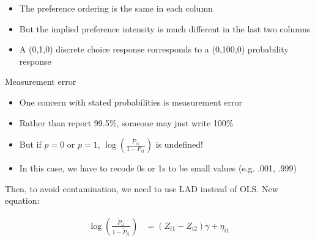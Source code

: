\documentclass[aspectratio=169]{beamer}
\begin{document}
\begin{frame}

\begin{itemize}
\itemsep1.5em
\item<1-> The preference ordering is the same in each column
\item<2-> But the implied preference intensity is much different in the last two columns
\item<3-> A (0,1,0) discrete choice response corresponds to a (0,100,0) probability response
\end{itemize}

\end{frame}

\begin{frame}

Measurement error

\bigskip{}

\begin{itemize}
\itemsep1.5em
\item<2-> One concern with stated probabilities is measurement error
\item<3-> Rather than report 99.5\%, someone may just write 100\%
\item<4-> But if $p=0$ or $p=1$, $\log\left(\frac{P_{i1}}{1-P_{i1}}\right)$ is undefined!
\item<5-> In this case, we have to recode 0s or 1s to be small values (e.g. .001, .999)
\end{itemize}

\end{frame}

\begin{frame}

Then, to avoid contamination, we need to use LAD instead of OLS. New equation:

\begin{align*}
\log\left(\frac{\tilde{P}_{i1}}{1-\tilde{P}_{i1}}\right) &= \left(Z_{i1}-Z_{i2}\right)\gamma + \eta_{i1}
\end{align*}

\bigskip{}


\end{frame}
\end{document}
